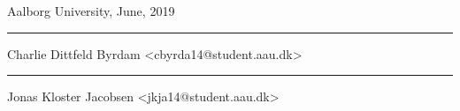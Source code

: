 {{        %
%
    }}

\label{page:titlepage}
\clearpage

\vspace{\baselineskip}\hfill Aalborg University, June, 2019
\vfill\noindent
\begin{minipage}[b]{0.45\textwidth}
    \centering
    \rule{\textwidth}{0.5pt}\smallbreak
    Charlie Dittfeld Byrdam\smallbreak
    {\footnotesize <cbyrda14@student.aau.dk>}
\end{minipage}
\hfill
\vspace{3\baselineskip}
\begin{minipage}[b]{0.45\textwidth}
    \centering
    \rule{\textwidth}{0.5pt}\smallbreak
    Jonas Kloster Jacobsen\smallbreak
    {\footnotesize <jkja14@student.aau.dk>}
\end{minipage}